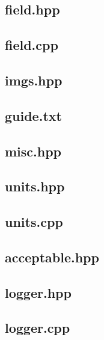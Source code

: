 \subsection{field.hpp}

\subsection{field.cpp}

\subsection{imgs.hpp}

\subsection{guide.txt}

\subsection{misc.hpp}

\subsection{units.hpp}

\subsection{units.cpp}

\subsection{acceptable.hpp}

\subsection{logger.hpp}

\subsection{logger.cpp}


